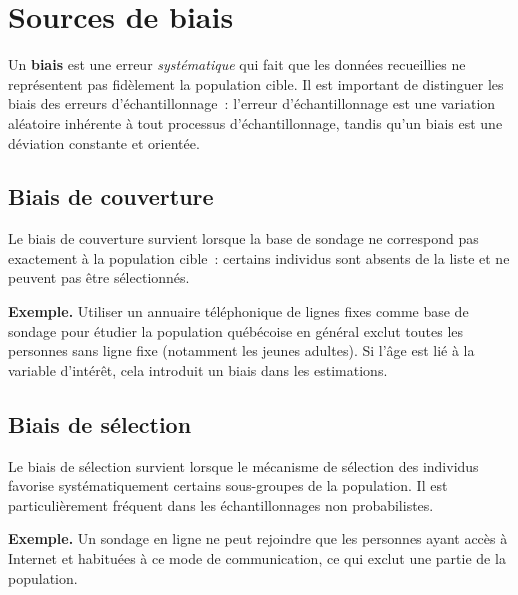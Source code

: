 \documentclass[11pt,french]{article}
\begin{document}
\section{Sources de biais}

Un \textbf{biais} est une erreur \emph{systématique} qui fait que les données recueillies ne
représentent pas fidèlement la population cible. Il est important de distinguer les biais des
erreurs d'échantillonnage~: l'erreur d'échantillonnage est une variation aléatoire inhérente
à tout processus d'échantillonnage, tandis qu'un biais est une déviation constante et
orientée.

\subsection{Biais de couverture}

Le biais de couverture survient lorsque la base de sondage ne correspond pas exactement à la
population cible~: certains individus sont absents de la liste et ne peuvent pas être
sélectionnés.

\textbf{Exemple.} Utiliser un annuaire téléphonique de lignes fixes comme base de sondage pour
étudier la population québécoise en général exclut toutes les personnes sans ligne fixe
(notamment les jeunes adultes). Si l'âge est lié à la variable d'intérêt, cela introduit un
biais dans les estimations.

\subsection{Biais de sélection}

Le biais de sélection survient lorsque le mécanisme de sélection des individus favorise
systématiquement certains sous-groupes de la population. Il est particulièrement fréquent dans
les échantillonnages non probabilistes.

\textbf{Exemple.} Un sondage en ligne ne peut rejoindre que les personnes ayant accès à
Internet et habituées à ce mode de communication, ce qui exclut une partie de la population.

\end{document}
